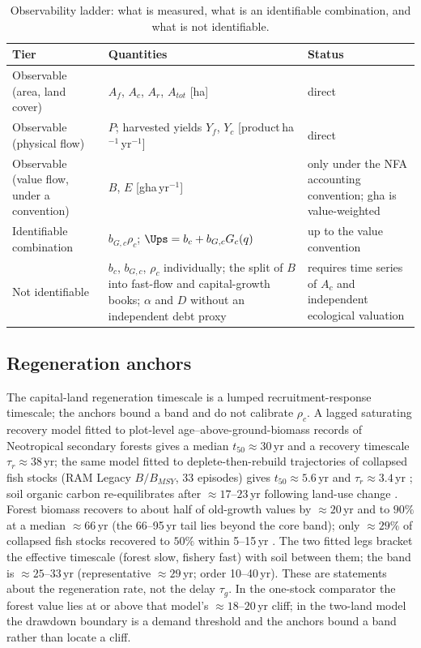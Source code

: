 \begin{table}[htbp]
\centering\small
\caption{Observability ladder: what is measured, what is an identifiable combination, and what is not identifiable.}
\label{tab:si_ladder}
\begin{tabularx}{\textwidth}{>{\raggedright\arraybackslash}p{} X >{\raggedright\arraybackslash}p{}}
\toprule
Tier & Quantities & Status \\
\midrule
Observable (area, land cover) & $A_f$, $A_c$, $A_r$, $A_{tot}$ [ha] & direct \\
Observable (physical flow) & $P$; harvested yields $Y_f$, $Y_c$ [product\,ha$^{-1}$\,yr$^{-1}$] & direct \\
Observable (value flow, under a convention) & $B$, $E$ [gha\,yr$^{-1}$] & only under the NFA accounting convention; gha is value-weighted \\
Identifiable combination & $b_{G,c}\rho_c$; $\Ups=b_c+b_{G,c}G_c(q)$ & up to the value convention \\
Not identifiable & $b_c$, $b_{G,c}$, $\rho_c$ individually; the split of $B$ into fast-flow and capital-growth books; $\alpha$ and $D$ without an independent debt proxy & requires time series of $A_c$ and independent ecological valuation \\
\bottomrule
\end{tabularx}
\end{table}

\subsection{Regeneration anchors}\label{si:anchors}

The capital-land regeneration timescale is a lumped recruitment-response timescale; the anchors bound a band and do not calibrate $\rho_c$. A lagged saturating recovery model fitted to plot-level age--above-ground-biomass records of Neotropical secondary forests \citep[2ndFOR;][1{,}334 plots, 41 chronosequences, 35 good fits]{Poorter2016} gives a median $t_{50}\approx30$\,yr and a recovery timescale $\tau_r\approx38$\,yr; the same model fitted to deplete-then-rebuild trajectories of collapsed fish stocks (RAM Legacy $B/B_{MSY}$, 33 episodes) gives $t_{50}\approx5.6$\,yr and $\tau_r\approx3.4$\,yr \citep[cf.][]{HutchingsReynolds2004,Neubauer2013}; soil organic carbon re-equilibrates after $\approx17$--$23$\,yr following land-use change \citep{Poeplau2011}. Forest biomass recovers to about half of old-growth values by $\approx20$\,yr and to $90\%$ at a median $\approx66$\,yr \citep{Poorter2016} (the 66--95\,yr tail lies beyond the core band); only $\approx29\%$ of collapsed fish stocks recovered to $50\%$ within 5--15\,yr \citep{HutchingsReynolds2004}. The two fitted legs bracket the effective timescale (forest slow, fishery fast) with soil between them; the band is $\approx25$--$33$\,yr (representative $\approx29$\,yr; order 10--40\,yr). These are statements about the regeneration rate, not the delay $\tau_g$. In the one-stock comparator the forest value lies at or above that model's $\approx18$--$20$\,yr cliff; in the two-land model the drawdown boundary is a demand threshold and the anchors bound a band rather than locate a cliff.

